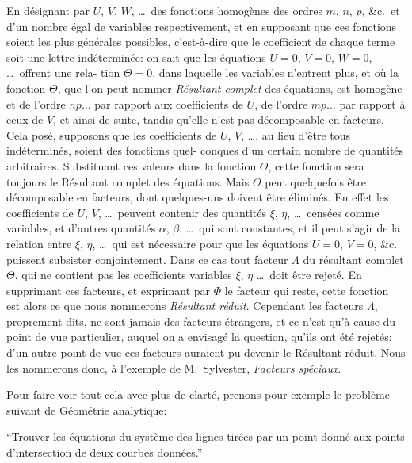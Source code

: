 \documentclass[11pt]{article}
\begin{document}
En d\'esignant par $U$, $V$, $W$, \ldots\ des fonctions homog\`enes des ordres $m$, $n$, $p$, \&c.\ et
d'un nombre \'egal de variables respectivement, et en supposant que ces fonctions soient
les plus g\'en\'erales possibles, c'est-\`a-dire que le coefficient de chaque terme soit une
lettre ind\'etermin\'ee: on sait que les \'equations $U = 0$, $V = 0$, $W = 0$, \ldots\ offrent une rela-
tion $\Theta = 0$, dans laquelle les variables n'entrent plus, et o\`u la fonction $\Theta$, que l'on
peut nommer \textit{R\'esultant complet} des \'equations, est homog\`ene et de l'ordre $n p \ldots$ par
rapport aux coefficients de $U$, de l'ordre $m p \ldots$ par rapport \`a ceux de $V$, et ainsi de
suite, tandis qu'elle n'est pas d\'ecomposable en facteurs. Cela pos\'e, supposons que les
coefficients de $U$, $V$, \ldots, au lieu d'\^etre tous ind\'etermin\'es, soient des fonctions quel-
conques d'un certain nombre de quantit\'es arbitraires. Substituant ces valeurs dans la
fonction $\Theta$, cette fonction sera toujours le R\'esultant complet des \'equations. Mais $\Theta$
peut quelquefois \^etre d\'ecomposable en facteurs, dont quelques-uns doivent \^etre \'elimin\'es.
En effet les coefficients de $U$, $V$, \ldots\ peuvent contenir des quantit\'es $\xi$, $\eta$, \ldots\ cens\'ees
comme variables, et d'autres quantit\'es $\alpha$, $\beta$, \ldots\ qui sont constantes, et il peut s'agir
de la relation entre $\xi$, $\eta$, \ldots\ qui est n\'ecessaire pour que les \'equations $U = 0$, $V = 0$, \&c.
puissent subsister conjointement. Dans ce cas tout facteur $\Lambda$ du r\'esultant complet $\Theta$,
qui ne contient pas les coefficients variables $\xi$, $\eta$ \ldots\ doit \^etre rejet\'e. En supprimant
ces facteurs, et exprimant par $\Phi$ le facteur qui reste, cette fonction est alors ce que
nous nommerons \textit{R\'esultant r\'eduit}. Cependant les facteurs $\Lambda$, proprement dits, ne sont
jamais des facteurs \'etrangers, et ce n'est qu'\`a cause du point de vue particulier,
auquel on a envisag\'e la question, qu'ils ont \'et\'e rejet\'es: d'un autre point de vue ces
facteurs auraient pu devenir le R\'esultant r\'eduit. Nous les nommerons donc, \`a l'exemple
de M.~Sylvester, \textit{Facteurs sp\'eciaux}.

\medskip

Pour faire voir tout cela avec plus de clart\'e, prenons pour exemple le probl\`eme
suivant de G\'eom\'etrie analytique:

``Trouver les \'equations du syst\`eme des lignes tir\'ees par un point donn\'e aux points
d'intersection de deux courbes donn\'ees.''
\end{document}

